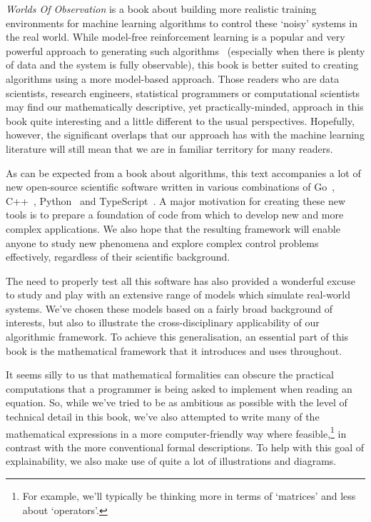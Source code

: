 \documentclass{book}
\begin{document}
\emph{Worlds Of Observation} is a book about building more realistic training environments for machine learning algorithms to control these `noisy' systems in the real world. While model-free reinforcement learning is a popular and very powerful approach to generating such algorithms~\cite{sutton2018reinforcement} (especially when there is plenty of data and the system is fully observable), this book is better suited to creating algorithms using a more model-based approach. Those readers who are data scientists, research engineers, statistical programmers or computational scientists may find our mathematically descriptive, yet practically-minded, approach in this book quite interesting and a little different to the usual perspectives. Hopefully, however, the significant overlaps that our approach has with the machine learning literature will still mean that we are in familiar territory for many readers.

As can be expected from a book about algorithms, this text accompanies a lot of new open-source scientific software written in various combinations of Go~\cite{golang}, C++~\cite{c++lang}, Python~\cite{pythonlang} and TypeScript~\cite{typescriptlang}. A major motivation for creating these new tools is to prepare a foundation of code from which to develop new and more complex applications. We also hope that the resulting framework will enable anyone to study new phenomena and explore complex control problems effectively, regardless of their scientific background.

The need to properly test all this software has also provided a wonderful excuse to study and play with an extensive range of models which simulate real-world systems. We've chosen these models based on a fairly broad background of interests, but also to illustrate the cross-disciplinary applicability of our algorithmic framework. To achieve this generalisation, an essential part of this book is the mathematical framework that it introduces and uses throughout.

It seems silly to us that mathematical formalities can obscure the practical computations that a programmer is being asked to implement when reading an equation. So, while we've tried to be as ambitious as possible with the level of technical detail in this book, we've also attempted to write many of the mathematical expressions in a more computer-friendly way where feasible,\footnote{For example, we'll typically be thinking more in terms of `matrices' and less about `operators'.} in contrast with the more conventional formal descriptions. To help with this goal of explainability, we also make use of quite a lot of illustrations and diagrams.
\end{document}
